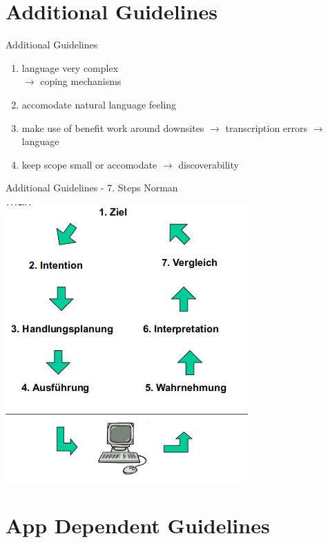 \documentclass[
  10pt
, handout
]{beamer}
\begin{document}
\section{Additional Guidelines}  %

\begin{frame}{Additional Guidelines}
 \begin{enumerate}
  \item<+-> {language very complex} \\
            $\rightarrow$ coping mechanisms

  \item<+-> {accomodate natural language feeling}

  \item<+-> {make use of benefit work around downsites}
            $\rightarrow$ transcription errors
            $\rightarrow$ language


  \item<+-> {keep scope small or accomodate}
            $\rightarrow$ discoverability
 \end{enumerate}
\end{frame}


\begin{frame}{Additional Guidelines - 7. Steps Norman}
  \begin{center}
    \includegraphics[scale=0.8]{resources/7_steps_norman.png}
  \end{center}
\end{frame}



\section{App Dependent Guidelines}  %
\end{document}
